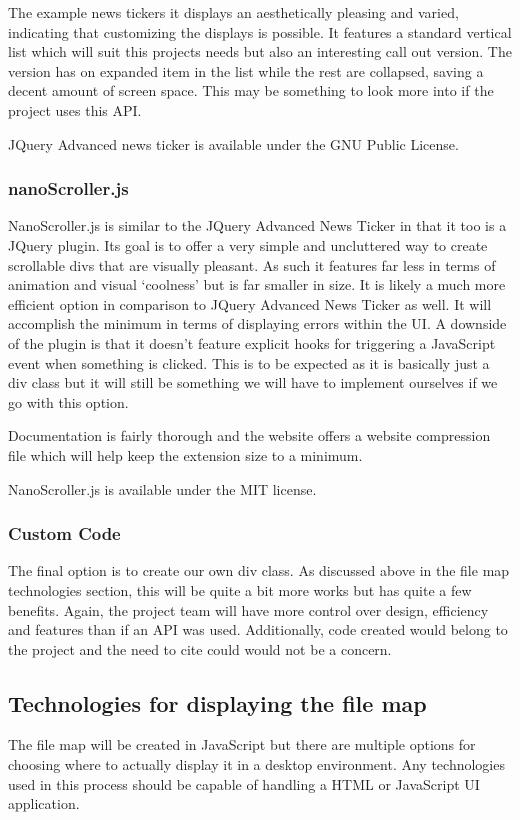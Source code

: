\documentclass[letterpaper,10pt,titlepage,draftclsnofoot,onecolumn,onesided] {IEEEtran}
\begin{document}
The example news tickers it displays an aesthetically pleasing and varied, indicating that customizing the displays is possible. 
It features a standard vertical list which will suit this projects needs but also an interesting call out version. 
The version has on expanded item in the list while the rest are collapsed, saving a decent amount of screen space. 
This may be something to look more into if the project uses this API.

JQuery Advanced news ticker is available under the GNU Public License.

\subsubsection{nanoScroller.js}
NanoScroller.js is similar to the JQuery Advanced News Ticker in that it too is a JQuery plugin. 
Its goal is to offer a very simple and uncluttered way to create scrollable divs that are visually pleasant. 
As such it features far less in terms of animation and visual `coolness' but is far smaller in size.
It is likely a much more efficient option in comparison to JQuery Advanced News Ticker as well. 
It will accomplish the minimum in terms of displaying errors within the UI. 
A downside of the plugin is that it doesn't feature explicit hooks for triggering a JavaScript event when something is clicked. 
This is to be expected as it is basically just a div class but it will still be something we will have to implement ourselves if we go with this option.

Documentation is fairly thorough and the website offers a website compression file which will help keep the extension size to a minimum. 

NanoScroller.js is available under the MIT license. 

\subsubsection{Custom Code}
The final option is to create our own div class. 
As discussed above in the file map technologies section, this will be quite a bit more works but has quite a few benefits. 
Again, the project team will have more control over design, efficiency and features than if an API was used. 
Additionally, code created would belong to the project and the need to cite could would not be a concern.

\subsection{Technologies for displaying the file map}
The file map will be created in JavaScript but there are multiple options for choosing where to actually display it in a desktop environment. 
Any technologies used in this process should be capable of handling a HTML or JavaScript UI application.
\end{document}
